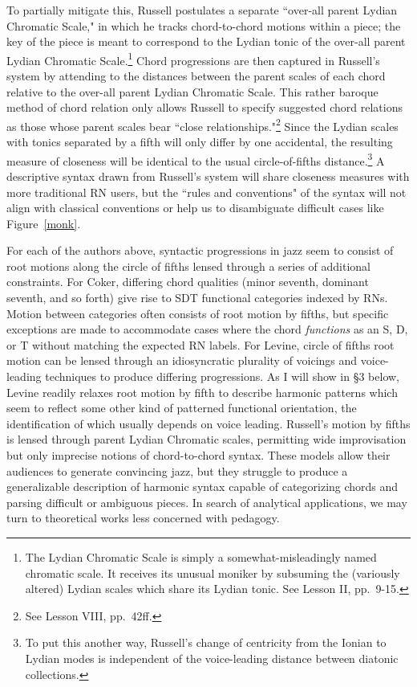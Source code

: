 To partially mitigate this, Russell postulates a separate ``over-all parent Lydian Chromatic Scale," in which he tracks chord-to-chord motions within a piece; the key of the piece is meant to correspond to the Lydian tonic of the over-all parent Lydian Chromatic Scale.\footnote{The Lydian Chromatic Scale is simply a somewhat-misleadingly named chromatic scale.  It receives its unusual moniker by subsuming the (variously altered) Lydian scales which share its Lydian tonic.  See Lesson II, pp.\ 9-15.}  Chord progressions are then captured in Russell's system by attending to the distances between the parent scales of each chord relative to the over-all parent Lydian Chromatic Scale.  This rather baroque method of chord relation only allows Russell to specify suggested chord relations as those whose parent scales bear ``close relationships."\footnote{See Lesson VIII, pp.\ 42ff.}  Since the Lydian scales with tonics separated by a fifth will only differ by one accidental, the resulting measure of closeness will be identical to the usual circle-of-fifths distance.\footnote{To put this another way, Russell's change of centricity from the Ionian to Lydian modes is independent of the voice-leading distance between diatonic collections.}  A descriptive syntax drawn from Russell's system will share closeness measures with more traditional RN users, but the ``rules and conventions" of the syntax will not align with classical conventions or help us to disambiguate difficult cases like Figure~\ref{monk}.

For each of the authors above, syntactic progressions in jazz seem to consist of root motions along the circle of fifths lensed through a series of additional constraints.  For Coker, differing chord qualities (minor seventh, dominant seventh, and so forth) give rise to SDT functional categories indexed by RNs.  Motion between categories often consists of root motion by fifths, but specific exceptions are made to accommodate cases where the chord \emph{functions} as an S, D, or T without matching the expected RN labels.  For Levine, circle of fifths root motion can be lensed through an idiosyncratic plurality of voicings and voice-leading techniques to produce differing progressions.  As I will show in \S 3 below, Levine readily relaxes root motion by fifth to describe harmonic patterns which seem to reflect some other kind of patterned functional orientation, the identification of which usually depends on voice leading.  Russell's motion by fifths is lensed through parent Lydian Chromatic scales, permitting wide improvisation but only imprecise notions of chord-to-chord syntax.  These models allow their audiences to generate convincing jazz, but they struggle to produce a generalizable description of harmonic syntax capable of categorizing chords and parsing difficult or ambiguous pieces.  In search of analytical applications, we may turn to theoretical works less concerned with pedagogy.

